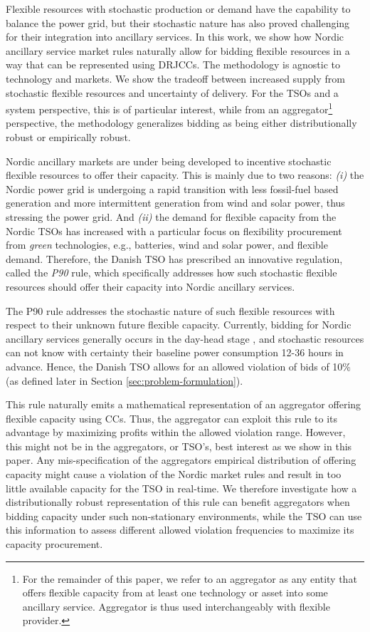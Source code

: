 \documentclass[conference]{IEEEtran}
\begin{document}
Flexible resources with stochastic production or demand have the capability to balance the power grid, but their stochastic nature has also proved challenging for their integration into ancillary services. In this work, we show how Nordic ancillary service market rules naturally allow for bidding flexible resources in a way that can be represented using \acp{DRJCC}. The methodology is agnostic to technology and markets. We show the tradeoff between increased supply from stochastic flexible resources and uncertainty of delivery. For the \acp{TSO} and a system perspective, this is of particular interest, while from an aggregator\footnote{For the remainder of this paper, we refer to an aggregator as any entity that offers flexible capacity from at least one technology or asset into some ancillary service. Aggregator is thus used interchangeably with flexible provider.} perspective, the methodology generalizes bidding as being either distributionally robust or empirically robust.

Nordic ancillary markets are under being developed to incentive stochastic flexible resources to offer their capacity. This is mainly due to two reasons: \textit{(i)} the Nordic power grid is undergoing a rapid transition with less fossil-fuel based generation and more intermittent generation from wind and solar power, thus stressing the power grid. And \textit{(ii)} the demand for flexible capacity from the Nordic \acp{TSO} has increased with a particular focus on flexibility procurement from \textit{green} technologies, e.g., batteries, wind and solar power, and flexible demand. Therefore, the Danish \ac{TSO} has prescribed an innovative regulation, called the \textit{P90} rule, which specifically addresses how such stochastic flexible resources should offer their capacity into Nordic ancillary services.

The P90 rule addresses the stochastic nature of such flexible resources with respect to their unknown future flexible capacity. Currently, bidding for Nordic ancillary services generally occurs in the day-head stage \cite{energinet}, and stochastic resources can not know with certainty their baseline power consumption 12-36 hours in advance. Hence, the Danish \ac{TSO} allows for an allowed violation of bids of 10\% (as defined later in Section \ref{sec:problem-formulation}).

This rule naturally emits a mathematical representation of an aggregator offering flexible capacity using \acp{CC}. Thus, the aggregator can exploit this rule to its advantage by maximizing profits within the allowed violation range. However, this might not be in the aggregators, or \ac{TSO}'s, best interest as we show in this paper. Any mis-specification of the aggregators empirical distribution of offering capacity might cause a violation of the Nordic market rules and result in too little available capacity for the \ac{TSO} in real-time. We therefore investigate how a distributionally robust representation of this rule can benefit aggregators when bidding capacity under such non-stationary environments, while the \ac{TSO} can use this information to assess different allowed violation frequencies to maximize its capacity procurement.
\end{document}
